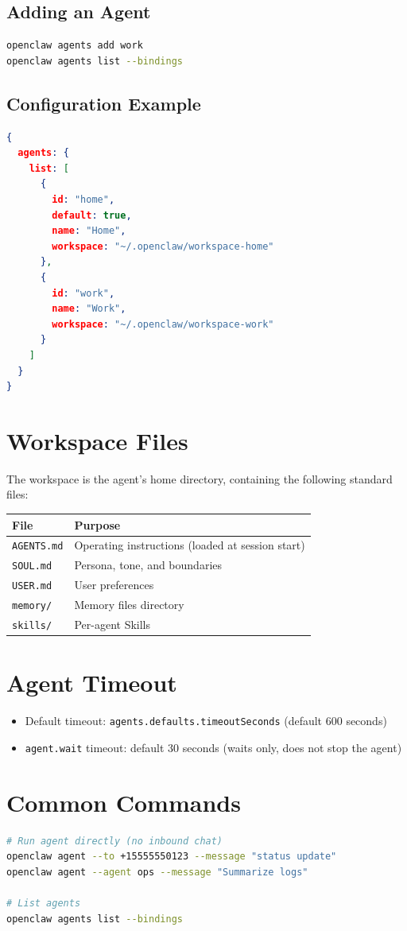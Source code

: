 \subsection{Adding an Agent}

\begin{lstlisting}[language=bash]
openclaw agents add work
openclaw agents list --bindings
\end{lstlisting}

\subsection{Configuration Example}

\begin{lstlisting}[language=json]
{
  agents: {
    list: [
      {
        id: "home",
        default: true,
        name: "Home",
        workspace: "~/.openclaw/workspace-home"
      },
      {
        id: "work",
        name: "Work",
        workspace: "~/.openclaw/workspace-work"
      }
    ]
  }
}
\end{lstlisting}

\section{Workspace Files}

The workspace is the agent's home directory, containing the following standard files:

\begin{center}
\begin{tabular}{ll}
\toprule
\textbf{File} & \textbf{Purpose} \\
\midrule
\texttt{AGENTS.md} & Operating instructions (loaded at session start) \\
\texttt{SOUL.md} & Persona, tone, and boundaries \\
\texttt{USER.md} & User preferences \\
\texttt{memory/} & Memory files directory \\
\texttt{skills/} & Per-agent Skills \\
\bottomrule
\end{tabular}
\end{center}

\section{Agent Timeout}

\begin{itemize}
  \item Default timeout: \texttt{agents.defaults.timeoutSeconds} (default 600 seconds)
  \item \texttt{agent.wait} timeout: default 30 seconds (waits only, does not stop the agent)
\end{itemize}

\section{Common Commands}

\begin{lstlisting}[language=bash]
# Run agent directly (no inbound chat)
openclaw agent --to +15555550123 --message "status update"
openclaw agent --agent ops --message "Summarize logs"

# List agents
openclaw agents list --bindings
\end{lstlisting}
